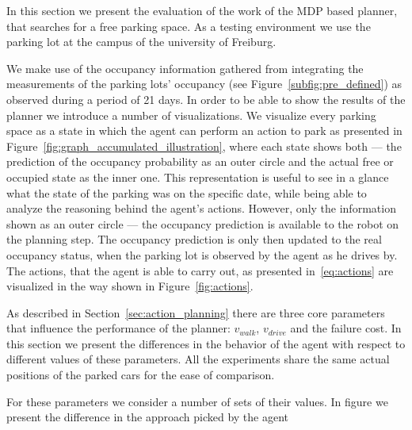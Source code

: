 In this section we present the evaluation of the work of the MDP based
planner, that searches for a free parking space. As a testing environment we
use the parking lot at the campus of the university of Freiburg.

We make use of the occupancy information gathered from integrating the
measurements of the parking lots' occupancy (see
Figure~\ref{subfig:pre_defined}) as observed during a period of 21 days. In
order to be able to show the results of the planner we introduce a number of
visualizations. We visualize every parking space as a state in which the agent
can perform an action to park as presented in
Figure~\ref{fig:graph_accumulated_illustration}, where each state shows both
--- the prediction of the occupancy probability as an outer circle and the
actual free or occupied state as the inner one. This representation is useful
to see in a glance what the state of the parking was on the specific date,
while being able to analyze the reasoning behind the agent's actions. However,
only the information shown as an outer circle --- the occupancy prediction is
available to the robot on the planning step. The occupancy prediction is only
then updated to the real occupancy status, when the parking lot is observed by
the agent as he drives by. The actions, that the agent is able to carry out,
as presented in~\eqref{eq:actions} are visualized in the way shown in
Figure~\ref{fig:actions}.

As described in Section~\ref{sec:action_planning} there are three core
parameters that influence the performance of the planner: $v_{walk}$,
$v_{drive}$ and the failure cost. In this section we present the differences
in the behavior of the agent with respect to different values of these
parameters. All the experiments share the same actual positions of the parked
cars for the ease of comparison.

For these parameters we consider a number of sets of their values.
In figure  we present the difference in the approach picked by the agent

